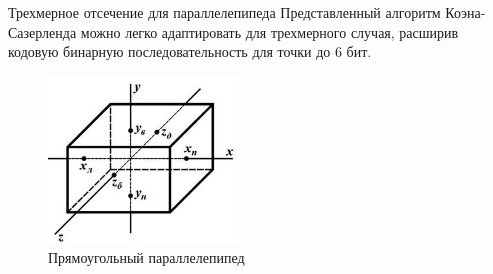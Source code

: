 \documentclass{beamer}
\begin{document}
	\begin{frame}{Трехмерное отсечение}{ для параллелепипеда}
		Представленный алгоритм Коэна-Сазерленда можно легко адаптировать для трехмерного случая, расширив кодовую бинарную последовательность для точки до 6 бит.

		\begin{figure} 
			\includegraphics[width=0.45\textwidth]{images/clipping_1.jpg}
			\caption {Прямоугольный параллелепипед}
		\end{figure}

	\end{frame}
\end{document}
